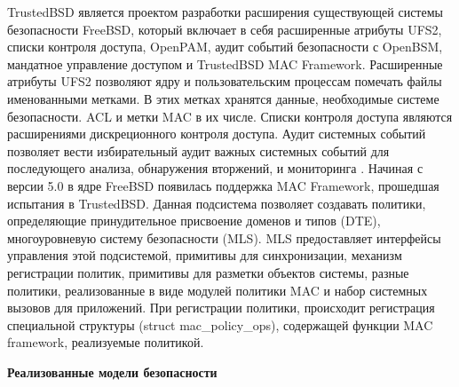 TrustedBSD является проектом разработки 
расширения существующей системы 
безопасности FreeBSD, который включает 
в себя  расширенные атрибуты UFS2, 
списки контроля доступа, OpenPAM, аудит событий 
безопасности с OpenBSM, мандатное управление доступом 
и TrustedBSD MAC Framework. 
Расширенные атрибуты UFS2 позволяют ядру и 
пользовательским процессам помечать файлы 
именованными метками. В этих метках
хранятся данные, необходимые системе безопасности. 
ACL и метки MAC в их числе. Списки контроля доступа являются 
 расширениями дискреционного контроля доступа. Аудит 
системных событий позволяет вести избирательный 
аудит важных системных событий для последующего 
анализа, обнаружения вторжений, и мониторинга  
. Начиная с версии 5.0 в ядре FreeBSD 
появилась поддержка MAC Framework, прошедшая испытания 
в TrustedBSD. Данная подсистема позволяет создавать политики, 
определяющие принудительное присвоение доменов и типов (DTE), 
многоуровневую систему безопасности (MLS). MLS  
предоставляет интерфейсы управления этой подсистемой, примитивы 
для синхронизации, механизм регистрации политик, примитивы 
для разметки объектов системы, разные политики, 
реализованные в виде модулей политики MAC и набор 
системных вызовов для приложений. При регистрации 
политики, происходит регистрация специальной структуры 
(struct mac\_policy\_ops), содержащей функции MAC 
framework, реализуемые политикой. 

\begin{comment}
На данный момент 
существуют следующие политики: 

mac\_biba – Реализация политики Biba, во многом 
схожей с MLS. Позволяет присваивать объектам и 
субъектам системы атрибуты доступа, которые образую 
иерархию уровней. Все операции над информацией в 
системе контролируются исходя из уровней 
взаимодействующих сущностей. 

mac\_ifoff позволяет администраторам контролировать 
сетевой трафик. 

mac\_lomac (Low-watermark MAC) еще одна 
реализация многоуровневого контроля доступа. 

mac\_bsdextended (file system firewall) Система 
защиты файлов, основанная на определении прав 
доступа на основании роли пользователя. 

mac\_mls реализация политики MLS. Объекты 
классифицируются некоторым образом, субъектам 
присваивают уровень доступа. 
\end{comment} 

\bigskip 
{\bfseries Реализованные модели безопасности}


